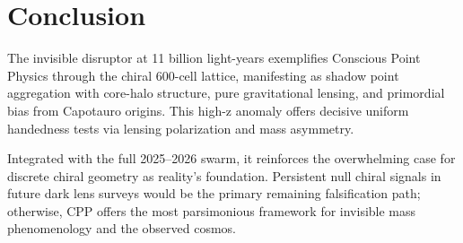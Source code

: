 \documentclass[11pt]{article}
\begin{document}
\section{Conclusion}
The invisible disruptor at 11 billion light-years exemplifies Conscious Point Physics through the chiral 600-cell lattice, manifesting as shadow point aggregation with core-halo structure, pure gravitational lensing, and primordial bias from Capotauro origins. This high-z anomaly offers decisive uniform handedness tests via lensing polarization and mass asymmetry.  

Integrated with the full 2025--2026 swarm, it reinforces the overwhelming case for discrete chiral geometry as reality's foundation. Persistent null chiral signals in future dark lens surveys would be the primary remaining falsification path; otherwise, CPP offers the most parsimonious framework for invisible mass phenomenology and the observed cosmos.
\end{document}
